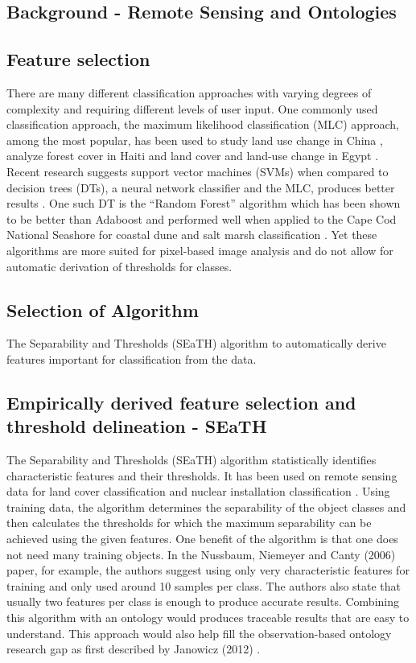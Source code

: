 \documentclass[a4paper,12pt]{article}
\begin{document}
\subsection{Background - Remote Sensing and Ontologies}

\subsection{Feature selection}

There are many different classification approaches with varying degrees of
complexity and requiring different levels of user input. One commonly used
classification approach, the maximum likelihood classification (MLC) approach,
among the most popular, has been used to study land use change in China
\cite{Ding2007}, analyze forest cover in Haiti \cite{Churches2014} and land
cover and land-use change in Egypt \cite{Shalaby2007}. Recent research suggests
support vector machines (SVMs) when compared to decision trees (DTs), a neural
network classifier and the MLC, produces better results \cite{Huang2002}. One
such DT is the ``Random Forest'' algorithm which has been shown to be better
than Adaboost \cite{Chan2008} and performed well when applied to the Cape Cod
National Seashore for coastal dune and salt marsh classification
\cite{Timm2012}.
Yet these algorithms are more suited for pixel-based image analysis and do not
allow for automatic derivation of thresholds for classes.

\subsection{Selection of Algorithm}
The Separability and Thresholds
(SEaTH) \cite{Nussbaum2006} algorithm to automatically derive features important
for classification from the data.
\subsection{Empirically derived feature selection and threshold delineation -
SEaTH} The Separability and Thresholds (SEaTH) algorithm \cite{Nussbaum2006}
statistically identifies characteristic features and their thresholds. It has
been used on remote sensing data for land cover classification \cite{Gao2011}
and nuclear installation classification \cite{Nussbaum2006}.
Using training data, the algorithm determines the separability of the object
classes and then calculates the thresholds for which the maximum separability
can be achieved using the given features. One benefit of the algorithm is that
one does not need many training objects.
In the Nussbaum, Niemeyer and Canty (2006) paper, for example, the authors
suggest using only very characteristic features for training and only used
around 10 samples per class\cite{Nussbaum2006}. The authors also state that
usually two features per class is enough to produce accurate results. Combining
this algorithm with an ontology would produces traceable results that are easy
to understand. This approach would also help fill the observation-based ontology
research gap as first described by Janowicz (2012) \cite{Janowicz2012}.
\end{document}
